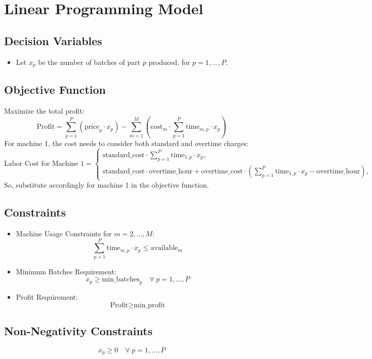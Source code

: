 \documentclass{article}
\begin{document}
\section*{Linear Programming Model}

\subsection*{Decision Variables}
\begin{itemize}
    \item Let \( x_p \) be the number of batches of part \( p \) produced, for \( p = 1, \ldots, P \).
\end{itemize}

\subsection*{Objective Function}
Maximize the total profit:
\[
\text{Profit} = \sum_{p=1}^{P} \left( \text{price}_{p} \cdot x_p \right) - \sum_{m=1}^{M} \left( \text{cost}_{m} \cdot \sum_{p=1}^{P} \text{time}_{m,p} \cdot x_p \right)
\]
For machine 1, the cost needs to consider both standard and overtime charges:
\[
\text{Labor Cost for Machine 1} = 
\begin{cases} 
\text{standard\_cost} \cdot \sum_{p=1}^{P} \text{time}_{1,p} \cdot x_p, & \text{if } \sum_{p=1}^{P} \text{time}_{1,p} \cdot x_p \leq \text{overtime\_hour} \\ 
\text{standard\_cost} \cdot \text{overtime\_hour} + \text{overtime\_cost} \cdot \left(\sum_{p=1}^{P} \text{time}_{1,p} \cdot x_p - \text{overtime\_hour}\right), & \text{otherwise}
\end{cases}
\]
So, substitute accordingly for machine 1 in the objective function.

\subsection*{Constraints}
\begin{itemize}
    \item Machine Usage Constraints for \( m = 2, \ldots, M \):
    \[
    \sum_{p=1}^{P} \text{time}_{m,p} \cdot x_p \leq \text{available}_{m}
    \]
    \item Minimum Batches Requirement:
    \[
    x_p \geq \text{min\_batches}_{p} \quad \forall \; p = 1, \ldots, P
    \]
    \item Profit Requirement:
    \[
    \text{Profit} \geq \text{min\_profit}
    \]
\end{itemize}

\subsection*{Non-Negativity Constraints}
\[
x_p \geq 0 \quad \forall \; p = 1, \ldots, P
\]
\end{document}
